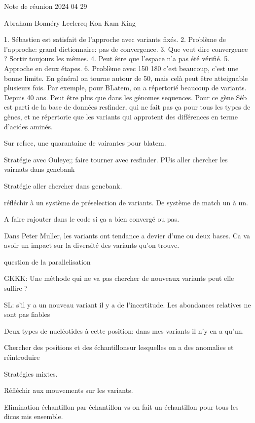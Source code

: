 \documentclass{article}
\begin{document}
Note de réunion 2024 04 29

Abraham Bonnéry Leclercq Kon Kam King

1. Sébastien est satisfait de l'approche avec variants fixés.
2. Problème de l'approche: grand dictionnaire: pas de convergence.
3. Que veut dire convergence ? 
Sortir toujours les mêmes.
4. Peut être que l'espace n'a pas été vérifié.
5. Approche en deux étapes.
6. Problème avec 150 180 c'est beaucoup, c'est une bonne limite. En général on tourne autour de 50, mais celà peut être atteignable plusieurs fois.
Par exemple, pour  BLatem, on a répertorié beaucoup de variants. Depuis 40 ans. Peut être plus que dans les génomes sequences.
Pour ce gène Séb est parti de la base de données resfinder, qui ne fait pas ça pour tous les types de gènes, et ne répertorie que les variants qui approtent des différences en terme d'acides aminés.

Sur refsec, une quarantaine de vairantes pour blatem.

Stratégie avec Ouleye;; faire tourner avec resfinder. PUis aller chercher les vairnats dans genebank

Stratégie aller chercher dans genebank. 


réfléchir à un système de préselection de variants. 
De système de match un à un.





A faire rajouter dans le code si ça a bien convergé ou pas.

Dans Peter Muller, les variants ont tendance a devier d'une ou deux bases.
Ca va avoir un impact sur la diversité des variants qu'on trouve.

question de la parallelisation

GKKK: Une méthode qui ne va pas chercher de nouveaux variants peut elle suffire ?

SL: s'il y a un nouveau variant il y a de l'incertitude. Les abondances relatives ne sont pas fiables

Deux types de nucléotides à cette position: dans mes variants il n'y en a qu'un.

Chercher des positions et des échantillonsur lesquelles on a des anomalies et réintroduire 

Stratégies mixtes.

Réfléchir aux mouvements sur les variants.

Elimination échantillon par échantillon
vs on fait un échantillon pour tous les dicos mis ensemble. 
\end{document}
